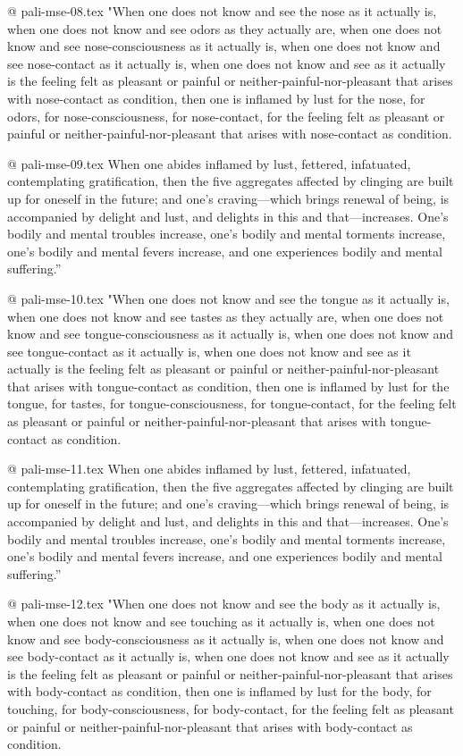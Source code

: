 @ pali-mse-08.tex
"When one does not know and see the nose as it actually is, when one does not know and see odors as they actually are, when one does not know and see nose-consciousness as it actually is, when one does not know and see nose-contact as it actually is, when one does not know and see as it actually is the feeling felt as pleasant or painful or neither-painful-nor-pleasant that arises with nose-contact as condition, then one is inflamed by lust for the nose, for odors, for nose-consciousness, for nose-contact, for the feeling felt as pleasant or painful or neither-painful-nor-pleasant that arises with nose-contact as condition.

@ pali-mse-09.tex
When one abides inflamed by lust, fettered, infatuated, contemplating gratification, then the five aggregates affected by clinging are built up for oneself in the future; and one’s craving—which brings renewal of being, is accompanied by delight and lust, and delights in this and that—increases. One’s bodily and mental troubles increase, one’s bodily and mental torments increase, one’s bodily and mental fevers increase, and one experiences bodily and mental suffering.”

@ pali-mse-10.tex
"When one does not know and see the tongue as it actually is, when one does not know and see tastes as they actually are, when one does not know and see tongue-consciousness as it actually is, when one does not know and see tongue-contact as it actually is, when one does not know and see as it actually is the feeling felt as pleasant or painful or neither-painful-nor-pleasant that arises with tongue-contact as condition, then one is inflamed by lust for the tongue, for tastes, for tongue-consciousness, for tongue-contact, for the feeling felt as pleasant or painful or neither-painful-nor-pleasant that arises with tongue-contact as condition.

@ pali-mse-11.tex
When one abides inflamed by lust, fettered, infatuated, contemplating gratification, then the five aggregates affected by clinging are built up for oneself in the future; and one’s craving—which brings renewal of being, is accompanied by delight and lust, and delights in this and that—increases. One’s bodily and mental troubles increase, one’s bodily and mental torments increase, one’s bodily and mental fevers increase, and one experiences bodily and mental suffering.”

@ pali-mse-12.tex
"When one does not know and see the body as it actually is, when one does not know and see touching as it actually is, when one does not know and see body-consciousness as it actually is, when one does not know and see body-contact as it actually is, when one does not know and see as it actually is the feeling felt as pleasant or painful or neither-painful-nor-pleasant that arises with body-contact as condition, then one is inflamed by lust for the body, for touching, for body-consciousness, for body-contact, for the feeling felt as pleasant or painful or neither-painful-nor-pleasant that arises with body-contact as condition.

